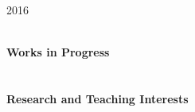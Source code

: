 \documentclass[12pt]{article}
\begin{document}
\begin{flushleft}
\begin{list}{}{}
\item[2016]

\end{list}



\hfill \\
\noindent \textbf{Works in Progress}\\
\hfill \\



\hfill \\
\noindent \textbf{Research and Teaching Interests}\\
\hfill \\


\end{flushleft}
\end{document}
